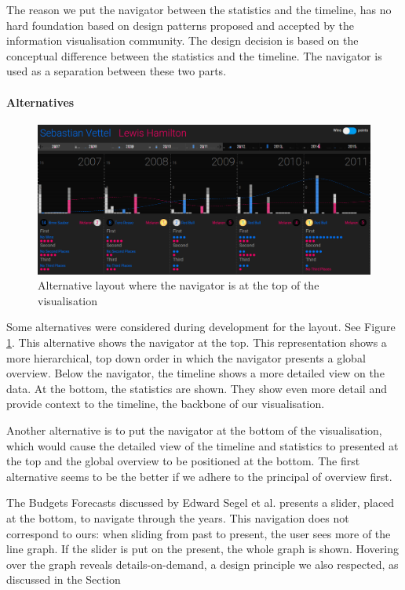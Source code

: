 \documentclass{sigchi}
\begin{document}
The reason we put the navigator between the statistics and the timeline, has no hard foundation based on design patterns proposed and accepted by the information visualisation community. The design decision is based on the conceptual difference between the statistics and the timeline. The navigator is used as a separation between these two parts.


\paragraph{Alternatives} 

\begin{figure}[ht]
  \centering
  \includegraphics[width=1\columnwidth]{images/top.png}
  \caption{Alternative layout where the navigator is at the top of the visualisation}
  \label{fig:top}
\end{figure}
Some alternatives were considered during development for the layout. See Figure \ref{fig:top}. This alternative shows the navigator at the top. This representation shows a more hierarchical, top down order in which the navigator presents a global overview. Below the navigator, the timeline shows a more detailed view on the data. At the bottom, the statistics are shown. They show even more detail and provide context to the timeline, the backbone of our visualisation. 

Another alternative is to put the navigator at the bottom of the visualisation, which would cause the detailed view of the timeline and statistics to presented at the top and the global overview to be positioned at the bottom. The first alternative seems to be the better if we adhere to the principal of overview first\cite{shneiderman1996eyes}.

The Budgets Forecasts discussed by Edward Segel et al.\cite{segel2010narrative} presents a slider, placed at the bottom, to navigate through the years.  This navigation does not correspond to ours: when sliding from past to present, the user sees more of the line graph. If the slider is put on the present, the whole graph is shown. Hovering over the graph reveals details-on-demand, a design principle we also respected, as discussed in the Section 
\end{document}

